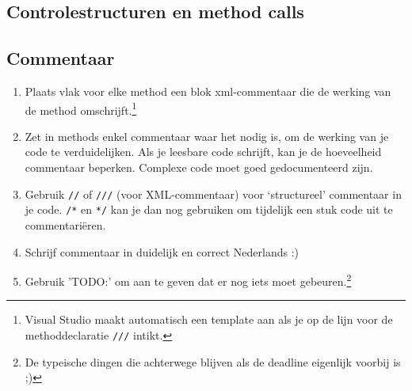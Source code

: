 \documentclass[a4paper,11pt]{article}
\begin{document}
\subsection{Controlestructuren en method calls}


\subsection{Commentaar}

\begin{enumerate}[resume]
\item Plaats vlak voor elke method een blok xml-commentaar die de werking van de method
omschrijft.\footnote{Visual Studio maakt automatisch een template aan als je op de lijn voor de
methoddeclaratie \lstinline !///! intikt.}
\item Zet in methods enkel commentaar waar het nodig is, om de werking van je code te
verduidelijken.  Als je leesbare code schrijft, kan je de hoeveelheid commentaar beperken.
Complexe code moet goed gedocumenteerd zijn.
\item Gebruik \lstinline !//! of \lstinline !///! (voor XML-commentaar) voor `structureel'
commentaar in je code.  \lstinline !/*! en \lstinline !*/! kan je dan nog gebruiken om tijdelijk
een stuk code uit te commentari\"eren.
\item Schrijf commentaar in duidelijk en correct Nederlands :)
\item Gebruik 'TODO:' om aan te geven dat er nog iets moet gebeuren.\footnote{De typeische
dingen die achterwege blijven als de deadline eigenlijk voorbij is ;)}
\end{enumerate}
\end{document}
